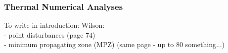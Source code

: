 
\subsubsection{Thermal Numerical Analyses}

To write in introduction: 
Wilson: \\
- point disturbances (page 74) \\
- minimum propagating zone (MPZ) (same page - up to 80 something...)